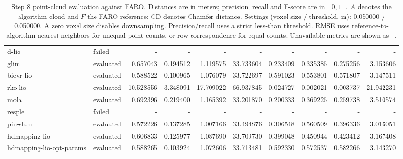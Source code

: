 \documentclass{article}
\begin{document}
\begin{table}[htbp]
\begin{tabular}{llrrrrrrrr}
d-lio & failed & - & - & - & - & - & - & - & - \\
glim & evaluated & 0.657043 & 0.194512 & 1.119575 & 33.733604 & 0.233409 & 0.335385 & 0.275256 & 3.153606 \\
bievr-lio & evaluated & 0.588522 & 0.100965 & 1.076079 & 33.722697 & 0.591023 & 0.553801 & 0.571807 & 3.147511 \\
rko-lio & evaluated & 10.528556 & 3.348091 & 17.709022 & 66.937845 & 0.024727 & 0.002021 & 0.003737 & 21.942231 \\
mola & evaluated & 0.692396 & 0.219400 & 1.165392 & 33.201870 & 0.200333 & 0.369225 & 0.259738 & 3.510574 \\
resple & failed & - & - & - & - & - & - & - & - \\
pin-slam & evaluated & 0.572226 & 0.137285 & 1.007166 & 33.494876 & 0.306548 & 0.560509 & 0.396336 & 3.016051 \\
hdmapping-lio & evaluated & 0.606833 & 0.125977 & 1.087690 & 33.709730 & 0.399048 & 0.450944 & 0.423412 & 3.167408 \\
hdmapping-lio-opt-params & evaluated & 0.588265 & 0.103924 & 1.072606 & 33.713481 & 0.592330 & 0.572537 & 0.582266 & 3.143270 \\
\hline
\end{tabular}
\caption{Step 8 point-cloud evaluation against FARO. Distances are in meters; precision, recall and F-score are in $[0,1]$. $A$ denotes the algorithm cloud and $F$ the FARO reference; CD denotes Chamfer distance. Settings (voxel size / threshold, m): 0.050000 / 0.050000. A zero voxel size disables downsampling. Precision/recall uses a strict less-than threshold. RMSE uses reference-to-algorithm nearest neighbors for unequal point counts, or row correspondence for equal counts. Unavailable metrics are shown as \texttt{-}.}
\label{tab:step8-point-cloud-evaluation}
\end{table}

\vspace*{\fill}
\end{document}
